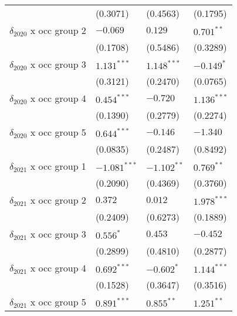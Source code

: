 \begin{tabular}{llll}
                                       &           (0.3071) &           (0.4563) &           (0.1795) \\
$\delta_{2020}$ x occ group 2          &           $-0.069$ &            $0.129$ &       $0.701^{**}$ \\
                                       &           (0.1708) &           (0.5486) &           (0.3289) \\
$\delta_{2020}$ x occ group 3          &      $1.131^{***}$ &      $1.148^{***}$ &         $-0.149^*$ \\
                                       &           (0.3121) &           (0.2470) &           (0.0765) \\
$\delta_{2020}$ x occ group 4          &      $0.454^{***}$ &           $-0.720$ &      $1.136^{***}$ \\
                                       &           (0.1390) &           (0.2779) &           (0.2274) \\
$\delta_{2020}$ x occ group 5          &      $0.644^{***}$ &           $-0.146$ &           $-1.340$ \\
                                       &           (0.0835) &           (0.2487) &           (0.8492) \\
$\delta_{2021}$ x occ group 1          &     $-1.081^{***}$ &      $-1.102^{**}$ &       $0.769^{**}$ \\
                                       &           (0.2090) &           (0.4369) &           (0.3760) \\
$\delta_{2021}$ x occ group 2          &            $0.372$ &            $0.012$ &      $1.978^{***}$ \\
                                       &           (0.2409) &           (0.6273) &           (0.1889) \\
$\delta_{2021}$ x occ group 3          &          $0.556^*$ &            $0.453$ &           $-0.452$ \\
                                       &           (0.2899) &           (0.4810) &           (0.2877) \\
$\delta_{2021}$ x occ group 4          &      $0.692^{***}$ &         $-0.602^*$ &      $1.144^{***}$ \\
                                       &           (0.1528) &           (0.3647) &           (0.3516) \\
$\delta_{2021}$ x occ group 5          &      $0.891^{***}$ &       $0.855^{**}$ &       $1.251^{**}$ \\

\end{tabular}
